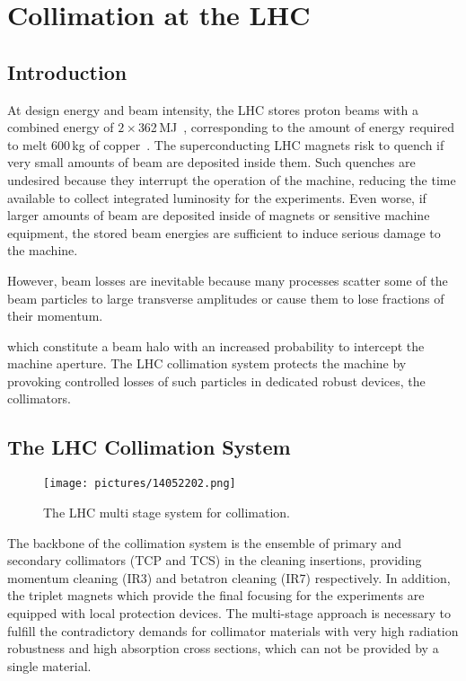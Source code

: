 \chapter{Collimation at the LHC}\label{chap:3}
%
\section*{Introduction}
%
At design energy and beam intensity, the LHC stores proton beams with a combined energy of $2 \times $362$\,$MJ~\cite{CERN-2004-003-V1}, corresponding to the amount of energy required to melt 600$\,$kg of copper~\cite{}. The superconducting LHC magnets risk to quench if very small amounts of beam are deposited inside them. Such quenches are undesired because they interrupt the operation of the machine, reducing the time available to collect integrated luminosity for the experiments. Even worse, if larger amounts of beam are deposited inside of magnets or sensitive machine equipment, the stored beam energies are sufficient to induce serious damage to the machine.

However, beam losses are inevitable because many processes scatter some of the beam particles to large transverse amplitudes or cause them to lose fractions of their momentum.  


which constitute a beam halo with an increased probability to intercept the machine aperture. The LHC collimation system protects the machine by provoking controlled losses of such particles in dedicated robust devices, the collimators.



%
\section{The LHC Collimation System}

%

  \begin{figure}[t]
  \centering
  \texttt{[image: pictures/14052202.png]}
  \caption{The LHC multi stage system for collimation.}  
  \label{pic:14052202}
  \end{figure}

The backbone of the collimation system is the ensemble of primary and secondary collimators (TCP and TCS) in the cleaning insertions, providing momentum cleaning (IR3) and betatron cleaning (IR7) respectively. In addition, the triplet magnets which provide the final focusing for the experiments are equipped with local protection devices. The multi-stage approach is necessary to fulfill the contradictory demands for collimator materials with very high radiation robustness and high absorption cross sections, which can not be provided by a single material. 



